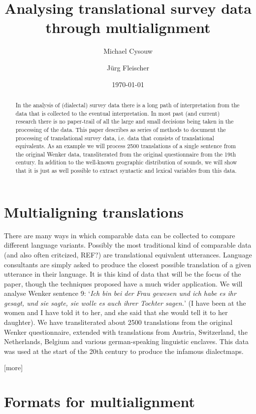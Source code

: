 \documentclass[11pt]{article}
\title{Analysing translational survey data through multialignment}
\author{Michael Cysouw \and Jürg Fleischer}
\date{\today}
\begin{document}
  
\maketitle
  
\begin{abstract}
In the analysis of (dialectal) survey data there is a long path of interpretation from the data that is collected to the eventual interpretation. In most past (and current) research there is no paper-trail of all the large and small decisions being taken in the processing of the data. This paper describes as series of methods to document the processing of translational survey data, i.e. data that consists of translational equivalents. As an example we will process 2500 translations of a single sentence from the original Wenker data, transliterated from the original questionnaire from the 19th century. In addition to the well-known geographic distribution of sounds, we will show that it is just as well possible to extract syntactic and lexical variables from this data.
\end{abstract}

\section{Multialigning translations}

There are many ways in which comparable data can be collected to compare different language variants. Possibly the most traditional kind of comparable data (and also often critcized, REF?) are translational equivalent utterances. Language consultants are simply asked to produce the closest possible translation of a given utterance in their language. It is this kind of data that will be the focus of the paper, though the techniques proposed have a much wider application. We will analyse Wenker sentence 9: `\textit{Ich bin bei der Frau gewesen und ich habe es ihr gesagt, und sie sagte, sie wolle es auch ihrer Tochter sagen.}' (I have been at the women and I have told it to her, and she said that she would tell it to her daughter). We have transliterated about 2500 translations from the original Wenker questionnaire, extended with translations from Austria, Switzerland, the Netherlands, Belgium and various german-speaking linguistic enclaves. This data was used at the start of the 20th century to produce the infamous dialectmaps.

[more]

\section{Formats for multialignment}
\end{document}
